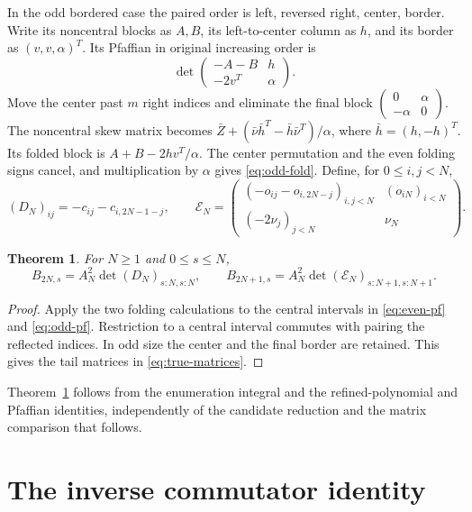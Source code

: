 \documentclass[11pt,a4paper]{amsart}
\newtheorem{theorem}{Theorem}[section]
\theoremstyle{remark}\newtheorem{remark}[theorem]{Remark}
\numberwithin{equation}{section}
\newcommand{\EE}{\mathcal E}
\begin{document}
In the odd bordered case the paired order is left, reversed right, center, border. Write its noncentral blocks as $A,B$, its left-to-center column as $h$, and its border as $(v,v,\alpha)^T$. Its Pfaffian in original increasing order is
\begin{equation}\label{eq:odd-fold}
 \det\begin{pmatrix}-A-B&h\\-2v^T&\alpha\end{pmatrix}.
\end{equation}
Move the center past $m$ right indices and eliminate the final block $\begin{pmatrix}0&\alpha\\-\alpha&0\end{pmatrix}$. The noncentral skew matrix becomes
$\bar Z+(\bar\nu\bar h^T-\bar h\bar\nu^T)/\alpha$, where $\bar h=(h,-h)^T$. Its folded block is $A+B-2hv^T/\alpha$. The center permutation and the even folding signs cancel, and multiplication by $\alpha$ gives \eqref{eq:odd-fold}.
Define, for $0\le i,j<N$,
\begin{equation}\label{eq:true-matrices}
 (D_N)_{ij}=-c_{ij}-c_{i,2N-1-j},\qquad
 \EE_N=\begin{pmatrix}
 (-o_{ij}-o_{i,2N-j})_{i,j<N}&(o_{iN})_{i<N}\\
 (-2\nu_j)_{j<N}&\nu_N
 \end{pmatrix}.
\end{equation}
\begin{theorem}\label{thm:true}
For $N\ge1$ and $0\le s\le N$,
\begin{equation}\label{eq:true-dets}
 B_{2N,s}=A_N^2\det(D_N)_{s:N,s:N},\qquad
 B_{2N+1,s}=A_N^2\det(\EE_N)_{s:N+1,s:N+1}.
\end{equation}
\end{theorem}
\begin{proof}
Apply the two folding calculations to the central intervals in \eqref{eq:even-pf} and \eqref{eq:odd-pf}. Restriction to a central interval commutes with pairing the reflected indices. In odd size the center and the final border are retained. This gives the tail matrices in \eqref{eq:true-matrices}.
\end{proof}
Theorem~\ref{thm:true} follows from the enumeration integral and the refined-polynomial and Pfaffian identities, independently of the candidate reduction and the matrix comparison that follows.

\section{The inverse commutator identity}\label{sec:inverse}
\end{document}

